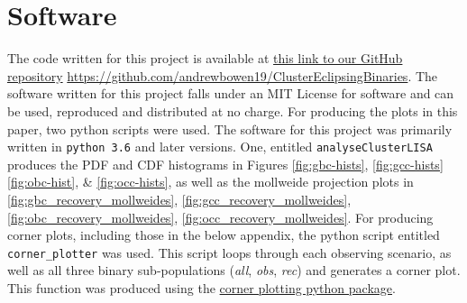 \documentclass[twocolumn]{aastex63}
\begin{document}
% 
%









\appendix


\section{Software}
\label{app:Appendix A}
The code written for this project is available at \href{https://github.com/andrewbowen19/ClusterEclipsingBinaries}{this link to our GitHub repository} \url{https://github.com/andrewbowen19/ClusterEclipsingBinaries}. The software written for this project falls under an MIT License for software and can be used, reproduced and distributed at no charge. For producing the plots in this paper, two python scripts were used. The software for this project was primarily written in \texttt{python 3.6} and later versions. One, entitled \texttt{analyseClusterLISA} produces the PDF and CDF histograms in Figures \ref{fig:gbc-hists}, \ref{fig:gcc-hists} \ref{fig:obc-hist}, \& \ref{fig:occ-hists}, as well as the mollweide projection plots in \ref{fig:gbc_recovery_mollweides}, \ref{fig:gcc_recovery_mollweides}, \ref{fig:obc_recovery_mollweides}, \ref{fig:occ_recovery_mollweides}. For producing corner plots, including those in the below appendix, the python script entitled \texttt{corner\_plotter} was used. This script loops through each observing scenario, as well as all three binary sub-populations (\textit{all}, \textit{obs}, \textit{rec}) and generates a corner plot. This function was produced using the \href{https://corner.readthedocs.io/en/latest/}{corner plotting python package}.
\end{document}
